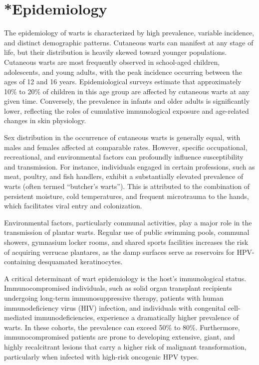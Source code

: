 \section{*{Epidemiology}}
The epidemiology of warts is characterized by high prevalence, variable incidence, and distinct demographic patterns. Cutaneous warts can manifest at any stage of life, but their distribution is heavily skewed toward younger populations. Cutaneous warts are most frequently observed in school-aged children, adolescents, and young adults, with the peak incidence occurring between the ages of 12 and 16 years. Epidemiological surveys estimate that approximately 10\% to 20\% of children in this age group are affected by cutaneous warts at any given time. Conversely, the prevalence in infants and older adults is significantly lower, reflecting the roles of cumulative immunological exposure and age-related changes in skin physiology.

Sex distribution in the occurrence of cutaneous warts is generally equal, with males and females affected at comparable rates. However, specific occupational, recreational, and environmental factors can profoundly influence susceptibility and transmission. For instance, individuals engaged in certain professions, such as meat, poultry, and fish handlers, exhibit a substantially elevated prevalence of warts (often termed ``butcher's warts''). This is attributed to the combination of persistent moisture, cold temperatures, and frequent microtrauma to the hands, which facilitates viral entry and colonization.

Environmental factors, particularly communal activities, play a major role in the transmission of plantar warts. Regular use of public swimming pools, communal showers, gymnasium locker rooms, and shared sports facilities increases the risk of acquiring verrucae plantares, as the damp surfaces serve as reservoirs for HPV-containing desquamated keratinocytes.

A critical determinant of wart epidemiology is the host's immunological status. Immunocompromised individuals, such as solid organ transplant recipients undergoing long-term immunosuppressive therapy, patients with human immunodeficiency virus (HIV) infection, and individuals with congenital cell-mediated immunodeficiencies, experience a dramatically higher prevalence of warts. In these cohorts, the prevalence can exceed 50\% to 80\%. Furthermore, immunocompromised patients are prone to developing extensive, giant, and highly recalcitrant lesions that carry a higher risk of malignant transformation, particularly when infected with high-risk oncogenic HPV types.

